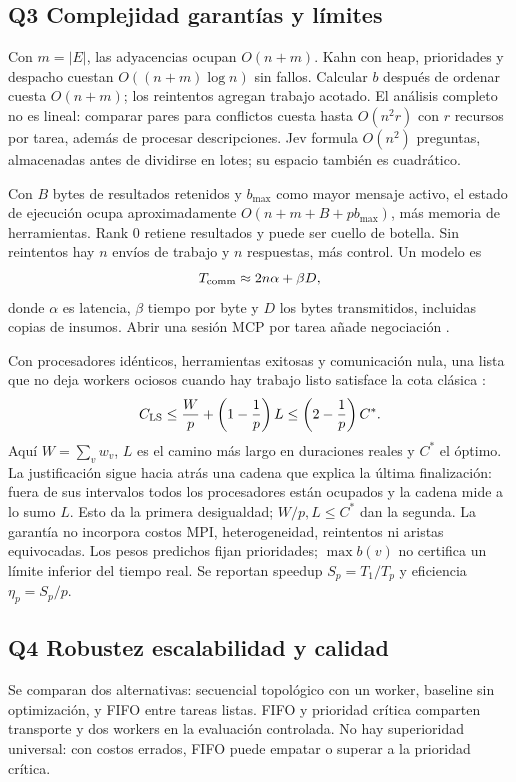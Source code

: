 \subsection{Q3 Complejidad garantías y límites}
Con $m=|E|$, las adyacencias ocupan $O(n+m)$. Kahn con heap,
prioridades y despacho cuestan $O((n+m)\log n)$ sin fallos.
Calcular $b$ después de ordenar cuesta $O(n+m)$; los reintentos agregan
trabajo acotado. El análisis completo no es lineal: comparar pares para
conflictos cuesta hasta $O(n^2r)$ con $r$ recursos por tarea, además
de procesar descripciones. Jev formula $O(n^2)$ preguntas, almacenadas
antes de dividirse en lotes; su espacio también es cuadrático.

Con $B$ bytes de resultados retenidos y $b_{\max}$ como mayor mensaje
activo, el estado de ejecución ocupa aproximadamente
$O(n+m+B+p b_{\max})$, más memoria de herramientas. Rank 0 retiene
resultados y puede ser cuello de botella. Sin reintentos hay $n$ envíos
de trabajo y $n$ respuestas, más control. Un modelo es
\begin{equation}
T_{\rm comm}\approx 2n\alpha+\beta D,
\end{equation}
donde $\alpha$ es latencia, $\beta$ tiempo por byte y $D$ los bytes
transmitidos, incluidas copias de insumos. Abrir una sesión MCP por tarea
añade negociación \cite{mcp,mpi}.

Con procesadores idénticos, herramientas exitosas y comunicación nula,
una lista que no deja workers ociosos cuando hay trabajo listo satisface
la cota clásica \cite{graham}:
\begin{equation}
C_{\rm LS}\leq \frac Wp+\left(1-\frac1p\right)L
\leq \left(2-\frac1p\right)C^*.
\end{equation}
Aquí $W=\sum_vw_v$, $L$ es el camino más largo en duraciones reales
y $C^*$ el óptimo. La justificación sigue hacia atrás una cadena que
explica la última finalización: fuera de sus intervalos todos los
procesadores están ocupados y la cadena mide a lo sumo $L$.
Esto da la primera desigualdad; $W/p,L\leq C^*$ dan la segunda.
La garantía no incorpora costos MPI, heterogeneidad, reintentos ni
aristas equivocadas. Los pesos predichos fijan prioridades; $\max b(v)$
no certifica un límite inferior del tiempo real. Se reportan
speedup $S_p=T_1/T_p$ y eficiencia $\eta_p=S_p/p$.

\subsection{Q4 Robustez escalabilidad y calidad}
Se comparan dos alternativas: secuencial topológico con un worker,
baseline sin optimización, y FIFO entre tareas listas. FIFO y prioridad
crítica comparten transporte y dos workers en la evaluación controlada.
No hay superioridad universal: con costos errados, FIFO puede empatar
o superar a la prioridad crítica.

